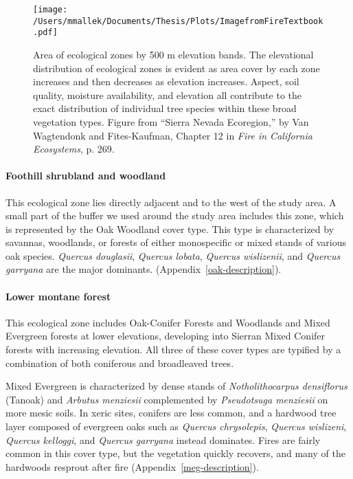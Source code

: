 \begin{figure}[!htbp]
\texttt{[image: /Users/mmallek/Documents/Thesis/Plots/ImagefromFireTextbook.pdf]}
\caption{Area of ecological zones by 500 m elevation bands. The elevational distribution of ecological zones is evident as area cover by each zone increases and then decreases as elevation increases. Aspect, soil quality, moisture availability, and elevation all contribute to the exact distribution of individual tree species within these broad vegetation types. Figure from ``Sierra Nevada Ecoregion,'' by Van Wagtendonk and Fites-Kaufman, Chapter 12 in \emph{Fire in California Ecosystems}, p. 269.}
\label{majorvegtypes}
\end{figure}

\paragraph{Foothill shrubland and woodland} This ecological zone lies directly adjacent and to the west of the study area. A small part of the buffer we used around the study area includes this zone, which is represented by the Oak Woodland cover type. This type is characterized by savannas, woodlands, or forests of either monospecific or mixed stands of various oak species. \emph{Quercus douglasii}, \emph{Quercus lobata}, \emph{Quercus wislizenii}, and \emph{Quercus garryana} are the major dominants. (Appendix~\ref{oak-description}). 

\paragraph{Lower montane forest} This ecological zone includes Oak-Conifer Forests and Woodlands and Mixed Evergreen forests at lower elevations, developing into Sierran Mixed Conifer forests with increasing elevation. All three of these cover types are typified by a combination of both coniferous and broadleaved trees. 

Mixed Evergreen is characterized by dense stands of \emph{Notholithocarpus densiflorus} (Tanoak) and \emph{Arbutus menziesii} complemented by \emph{Pseudotsuga menziesii} on more mesic soils. In xeric sites, conifers are less common, and a hardwood tree layer composed of evergreen oaks such as \emph{Quercus chrysolepis}, \emph{Quercus wislizeni}, \emph{Quercus kelloggi}, and \emph{Quercus garryana} instead dominates. Fires are fairly common in this cover type, but the vegetation quickly recovers, and many of the hardwoods resprout after fire (Appendix~\ref{meg-description}). 

